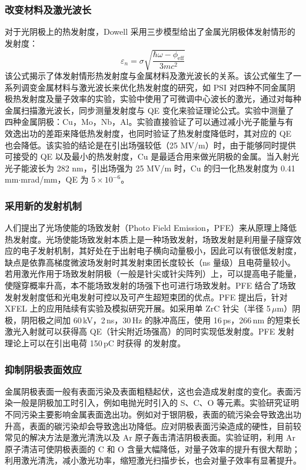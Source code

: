 \subsubsection{改变材料及激光波长}
对于光阴极上的热发射度，Dowell 采用三步模型给出了金属光阴极体发射情形的发射度\cite{Dowell:2006aa,dowell2009quantum}：
\[
	\varepsilon_{n} =\sigma\sqrt{\dfrac{\hbar\omega-\phi_{\mathrm{eff}}}{3mc^2}}
\]
该公式揭示了体发射情形热发射度与金属材料及激光波长的关系。该公式催生了一系列调变金属材料与激光波长来优化热发射度的研究，如 PSI 对四种不同金属阴极热发射度及量子效率的实验\cite{hauri2010intrinsic}，实验中使用了可微调中心波长的激光，通过对每种金属扫描激光波长，同步测量发射度与 QE 变化来验证理论公式。实验中测量了四种金属阴极：Cu，Mo，Nb，Al。实验直接验证了可以通过减小光子能量与有效逸出功的差距来降低热发射度，也同时验证了热发射度降低时，其对应的 QE 也会降低。该实验的结论是在引出场强较低（25 MV/m）时，由于能够同时提供可接受的 QE 以及最小的热发射度，Cu 是最适合用来做光阴极的金属。当入射光光子能波长为 282 nm，引出场强为 25 MV/m  时，Cu 的归一化热发射度为 0.41\,mm$\cdot$mrad/mm，QE 为 $5\times10^{-6}$。

\subsubsection{采用新的发射机制}
人们提出了光场使能的场致发射（Photo Field Emission，PFE）来从原理上降低热发射度\cite{Reifenberger:1979aa}。光场使能场致发射本质上是一种场致发射，场致发射是利用量子隧穿效应的电子发射机制，其好处在于出射电子横向动量极小，因此可以有很低发射度，缺点是依靠高梯度微波场发射时其发射束团长度较长（ns 量级）且电荷量较小。若用激光作用于场致发射阴极（一般是针尖或针尖阵列）上，可以提高电子能量，使隧穿概率升高，本不能场致发射的场强下也可进行场致发射。PFE 结合了场致发射发射度低和光电发射可控以及可产生超短束团的优点。PFE 提出后，针对 XFEL 上的应用陆续有实验\cite{Ganter:2008aa,Mingels:2012aa,Mingels:2013aa,Mingels:2014aa}及模拟研究\cite{Fallahi:2014aa}开展。如采用单 ZrC 针尖（半径 5\,$\mu$m）阴极，阴阳极之间加 60\,kV，2\,ns，30\,Hz 的脉冲高压，使用 16\,ps，266\,nm 的短束长激光入射就可以获得高 QE（针尖附近场强高）的同时实现低发射度。PFE 发射理论上可以在引出电荷 150\,pC 时获得  的发射度。

\subsubsection{抑制阴极表面效应}
金属阴极表面一般有表面污染及表面粗糙起伏，这也会造成发射度的变化。表面污染一般是阴极加工时引入，例如电抛光时引入的 S、C、O 等元素。实验研究证明不同污染主要影响金属表面逸出功\cite{Chelvayohan:1982aa,Opower:2006aa,Valizadeh:2013aa}。例如对于银阴极，表面的硫污染会导致逸出功升高，表面的碳污染却会导致逸出功降低\cite{Chelvayohan:1982aa}。应对阴极表面污染造成的硬性，目前较常见的解决方法是激光清洗\cite{Brachmann:2011aa}以及 Ar 原子轰击清洁阴极表面\cite{Chelvayohan:1982aa,Valizadeh:2013aa}。实验证明，利用 Ar 原子清洁可使阴极表面的 C 和 O 含量大幅降低，对量子效率的提升有很大帮助\cite{Valizadeh:2013aa}；利用激光清洗，减小激光功率，缩短激光扫描步长，也会对量子效率有显著提升\cite{Brachmann:2011aa}。

